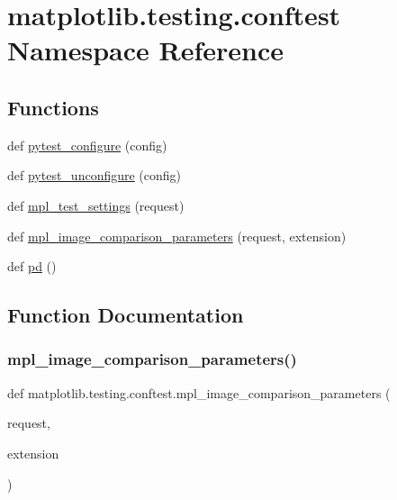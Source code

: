 \hypertarget{namespacematplotlib_1_1testing_1_1conftest}{}\section{matplotlib.\+testing.\+conftest Namespace Reference}
\label{namespacematplotlib_1_1testing_1_1conftest}
\subsection*{Functions}
\begin{DoxyCompactItemize}
\item 
def \hyperlink{namespacematplotlib_1_1testing_1_1conftest_a5faa37176baef34176fd218776a11661}{pytest\+\_\+configure} (config)
\item 
def \hyperlink{namespacematplotlib_1_1testing_1_1conftest_a219de1c94185e5c8ebbd8c09cef6ec53}{pytest\+\_\+unconfigure} (config)
\item 
def \hyperlink{namespacematplotlib_1_1testing_1_1conftest_adc307f35fba84ca1bf78072e29afd765}{mpl\+\_\+test\+\_\+settings} (request)
\item 
def \hyperlink{namespacematplotlib_1_1testing_1_1conftest_aa23cc36878506fa7db8a21da6cd4f652}{mpl\+\_\+image\+\_\+comparison\+\_\+parameters} (request, extension)
\item 
def \hyperlink{namespacematplotlib_1_1testing_1_1conftest_a642a9a1ad191126bc965df58f4cf6c4a}{pd} ()
\end{DoxyCompactItemize}


\subsection{Function Documentation}
\mbox{\label{namespacematplotlib_1_1testing_1_1conftest_aa23cc36878506fa7db8a21da6cd4f652}} 
\subsubsection{\texorpdfstring{mpl\+\_\+image\+\_\+comparison\+\_\+parameters()}{mpl\_image\_comparison\_parameters()}}
{\footnotesize\ttfamily def matplotlib.\+testing.\+conftest.\+mpl\+\_\+image\+\_\+comparison\+\_\+parameters (\begin{DoxyParamCaption}\item[{}]{request,  }\item[{}]{extension }\end{DoxyParamCaption})}

